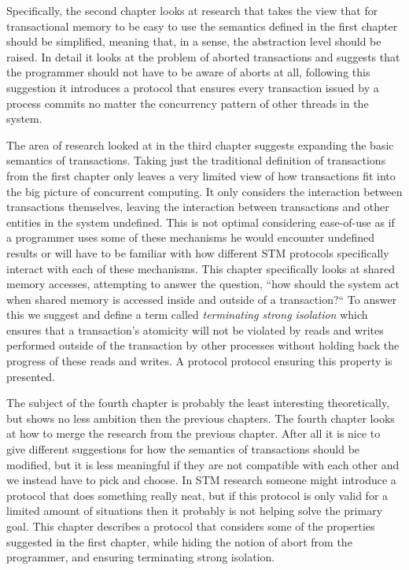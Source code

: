 Specifically, the second chapter looks at research that takes the view that for transactional memory to
be easy to use the semantics defined in the first chapter should be simplified, meaning that,
in a sense, the abstraction level should be raised.
In detail it looks at the problem of aborted transactions and suggests that
the programmer should not have to be aware of aborts at all, following this suggestion it introduces a protocol
that ensures every transaction issued by a process commits no matter the concurrency pattern
of other threads in the system.

The area of research looked at in the third chapter suggests expanding the basic semantics of transactions.
Taking just the traditional definition of transactions from the first chapter only leaves a very limited view of how
transactions fit into the big picture of concurrent computing.
It only considers the interaction between transactions themselves,
leaving the interaction between
transactions and other entities in the system undefined.
This is not optimal considering ease-of-use as if a programmer uses
some of these mechanisms he would encounter undefined results or will have
to be familiar with how different STM protocols specifically interact with 
each of these mechanisms.
This chapter specifically looks at shared memory accesses, attempting to answer the question, ``how should the system act when shared memory
is accessed inside and outside of a transaction?``
To answer this we suggest and define a term called \emph{terminating strong isolation} which ensures
that a transaction's atomicity will not be violated by reads and writes performed
outside of the transaction by other processes without holding back the progress of
these reads and writes.
A protocol protocol ensuring this property is presented.

The subject of the fourth chapter is probably the least interesting theoretically, but
shows no less ambition then the previous chapters.
The fourth chapter looks at how to merge the research
from the previous chapter.
After all it is nice to give different suggestions for how the semantics
of transactions should be modified, but it is less meaningful if they are not compatible with
each other and we instead have to pick and choose.
In STM research someone might introduce a protocol that does something really neat, but
if this protocol is only valid for a limited amount of situations then it probably
is not helping solve the primary goal.
This chapter describes a protocol that considers some of the properties suggested
in the first chapter, while hiding the notion of abort from the programmer,
and ensuring terminating strong isolation. 

